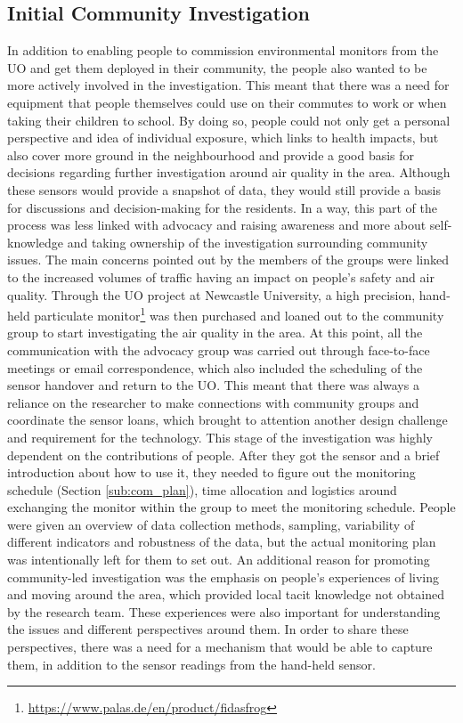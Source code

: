 \subsection{Initial Community Investigation}
\label{sub:com_invest}
In addition to enabling people to commission environmental monitors from the UO and get them deployed in their community, the people also wanted to be more actively involved in the investigation. This meant that there was a need for equipment that people themselves could use on their commutes to work or when taking their children to school. By doing so, people could not only get a personal perspective and idea of individual exposure, which links to health impacts, but also cover more ground in the neighbourhood and provide a good basis for decisions regarding further investigation around air quality in the area. Although these sensors would provide a snapshot of data, they would still provide a basis for discussions and decision-making for the residents. In a way, this part of the process was less linked with advocacy and raising awareness and more about self-knowledge and taking ownership of the investigation surrounding community issues. The main concerns pointed out by the members of the groups were linked to the increased volumes of traffic having an impact on people's safety and air quality. Through the UO project at Newcastle University, a high precision, hand-held particulate monitor\footnote{\url{https://www.palas.de/en/product/fidasfrog}} was then purchased and loaned out to the community group to start investigating the air quality in the area. At this point, all the communication with the advocacy group was carried out through face-to-face meetings or email correspondence, which also included the scheduling of the sensor handover and return to the UO. This meant that there was always a reliance on the researcher to make connections with community groups and coordinate the sensor loans, which brought to attention another design challenge and requirement for the technology. This stage of the investigation was highly dependent on the contributions of people. After they got the sensor and a brief introduction about how to use it, they needed to figure out the monitoring schedule (Section \ref{sub:com_plan}), time allocation and logistics around exchanging the monitor within the group to meet the monitoring schedule. People were given an overview of data collection methods, sampling, variability of different indicators and robustness of the data, but the actual monitoring plan was intentionally left for them to set out. An additional reason for promoting community-led investigation was the emphasis on people's experiences of living and moving around the area, which provided local tacit knowledge not obtained by the research team. These experiences were also important for understanding the issues and different perspectives around them. In order to share these perspectives, there was a need for a mechanism that would be able to capture them, in addition to the sensor readings from the hand-held sensor.
\newline

